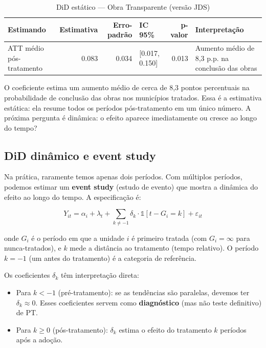 \documentclass[
]{article}
\providecommand{\tightlist}{%
  \setlength{\itemsep}{0pt}\setlength{\parskip}{0pt}}
\begin{document}
\begin{table}

\caption{\label{tab:ot-did-estatico}DiD estático — Obra Transparente (versão JDS)}
\centering
\begin{tabular}[t]{l|r|r|l|r|l}
\hline
Estimando & Estimativa & Erro-padrão & IC 95\% & p-valor & Interpretação\\
\hline
ATT médio pós-tratamento & 0.083 & 0.034 & [0.017, 0.150] & 0.013 & Aumento médio de 8,3 p.p. na conclusão das obras\\
\hline
\end{tabular}
\end{table}

O coeficiente estima um aumento médio de cerca de 8,3 pontos percentuais na probabilidade de conclusão das obras nos municípios tratados. Essa é a estimativa estática: ela resume todos os períodos pós-tratamento em um único número. A próxima pergunta é dinâmica: o efeito aparece imediatamente ou cresce ao longo do tempo?

\subsection{DiD dinâmico e event study}\label{did-dinuxe2mico-e-event-study}

Na prática, raramente temos apenas dois períodos. Com múltiplos períodos, podemos estimar um \textbf{event study} (estudo de evento) que mostra a dinâmica do efeito ao longo do tempo. A especificação é:

\[
Y_{it} = \alpha_i + \lambda_t + \sum_{k \neq -1} \delta_k \cdot \mathbb{1}[t - G_i = k] + \varepsilon_{it}
\]

onde \(G_i\) é o período em que a unidade \(i\) é primeiro tratada (com \(G_i = \infty\) para nunca-tratados), e \(k\) mede a distância ao tratamento (tempo relativo). O período \(k = -1\) (um antes do tratamento) é a categoria de referência.

Os coeficientes \(\delta_k\) têm interpretação direta:

\begin{itemize}
\tightlist
\item
  Para \(k < -1\) (pré-tratamento): se as tendências são paralelas, devemos ter \(\delta_k \approx 0\). Esses coeficientes servem como \textbf{diagnóstico} (mas não teste definitivo) de PT.
\item
  Para \(k \geq 0\) (pós-tratamento): \(\delta_k\) estima o efeito do tratamento \(k\) períodos após a adoção.
\end{itemize}
\end{document}
